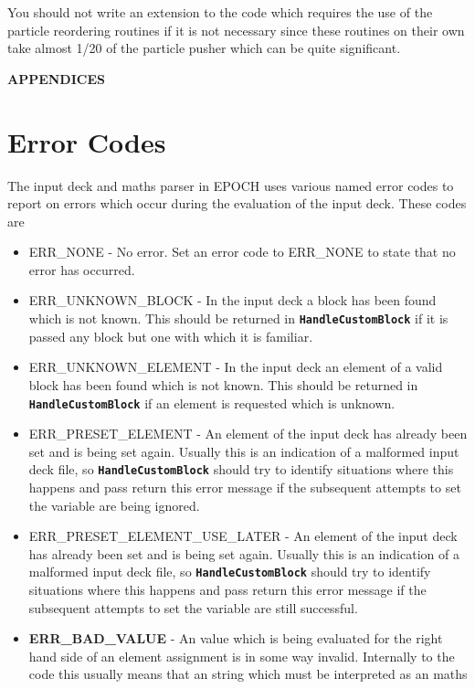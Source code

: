 \documentclass[12pt]{article}
\newcommand{\inlinecode}[1]{{\color{warwickred} \bf\texttt{#1}}}
\newcommand{\EPOCH}{{\color{warwickdark}\fontfamily{phv}\selectfont EPOCH} }
\begin{document}
You should not write an extension to the code which requires the use of the
particle reordering routines if it is not necessary since these routines on
their own take almost 1/20 of the particle pusher which can be quite
significant.

\pagebreak

\appendix
  \begin{center}
    {\bf APPENDICES}
  \end{center}
\section{Error Codes}
The input deck and maths parser in \EPOCH uses various named error codes to
report on errors which occur during the evaluation of the input deck. These
codes are
\begin{itemize}
\item ERR\_NONE - No error. Set an error code to ERR\_NONE to state that no
  error has occurred.
\item ERR\_UNKNOWN\_BLOCK - In the input deck a block has been found which is
  not known. This should be returned in \inlinecode{HandleCustomBlock} if it is
  passed any block but one with which it is familiar.
\item ERR\_UNKNOWN\_ELEMENT - In the input deck an element of a valid block has
  been found which is not known. This should be returned in
  \inlinecode{HandleCustomBlock} if an element is requested which is unknown.
\item ERR\_PRESET\_ELEMENT - An element of the input deck has already been set
  and is being set again. Usually this is an indication of a malformed input
  deck file, so \inlinecode{HandleCustomBlock} should try to identify
  situations where this happens and pass return this error message if the
  subsequent attempts to set the variable are being ignored.
\item ERR\_PRESET\_ELEMENT\_USE\_LATER - An element of the input deck has
  already been set and is being set again. Usually this is an indication of a
  malformed input deck file, so \inlinecode{HandleCustomBlock} should try to
  identify situations where this happens and pass return this error message if
  the subsequent attempts to set the variable are still successful.
\item {\bf ERR\_BAD\_VALUE} - An value which is being evaluated for the right
  hand side of an element assignment is in some way invalid. Internally to the
  code this usually means that an string which must be interpreted as an maths

\end{itemize}
\end{document}
